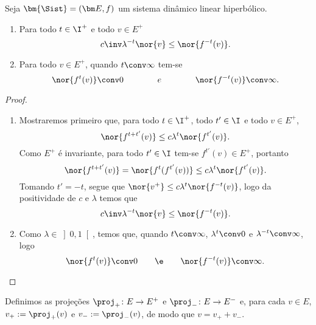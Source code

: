 \begin{proposition}
Seja $\bm{\Sist}=(\bm E,f)$ um sistema dinâmico linear hiperbólico.
	\begin{enumerate}
	\item Para todo $t \in \I^+$ e todo $v \in E^+$
		\begin{equation*}
		c\inv\lambda^{-t}\nor{v} \leq  \nor{f^{-t}(v)}.
		\end{equation*}
	\item Para todo $v \in E^+$, quando $t \conv \infty$ tem-se
		\begin{equation*}
		\nor{f^t(v)} \conv 0 \qquad\qquad e \qquad\qquad \nor{f^{-t}(v)} \conv \infty.
		\end{equation*}
	\end{enumerate}
\end{proposition}
\begin{proof}
	\begin{enumerate}
	\item	 Mostraremos primeiro que, para todo $t \in \I^+$, todo $t' \in \I$ e todo $v \in E^+$,
		\begin{equation*}
		\nor{f^{t+t'}(v)} \leq c\lambda^t \nor{f^{t'}(v)}.
		\end{equation*}
Como $E^+$ é invariante, para todo $t' \in \I$ tem-se $f^{t'}(v) \in E^+$, portanto
		\begin{equation*}
		\nor{f^{t+t'}(v)} = \nor{f^t(f^{t'}(v))} \leq c\lambda^t \nor{f^{t'}(v)}.
		\end{equation*}
Tomando $t'=-t$, segue que $\nor{v^+} \leq c\lambda^t \nor{f^{-t}(v)}$, logo da positividade de $c$ e $\lambda$ temos que
		\begin{equation*}
		c\inv\lambda^{-t}\nor{v} \leq  \nor{f^{-t}(v)}.
		\end{equation*}
	\item Como $\lambda \in \left]0,1\right[$, temos que, quando $t \conv \infty$, $\lambda^t \conv 0$ e $\lambda^{-t} \conv \infty$, logo
		\begin{equation*}
		\nor{f^t(v)} \conv 0 \qquad\e\qquad \nor{f^{-t}(v)} \conv \infty. \qedhere
		\end{equation*}
	\end{enumerate}
\end{proof}

Definimos as projeções $\proj_+\colon E \to E^+$ e $\proj_-\colon E \to E^-$ e, para cada $v \in E$, $v_+ := \proj_+(v)$ e $v_- := \proj_-(v)$, de modo que $v=v_+ + v_-$.

